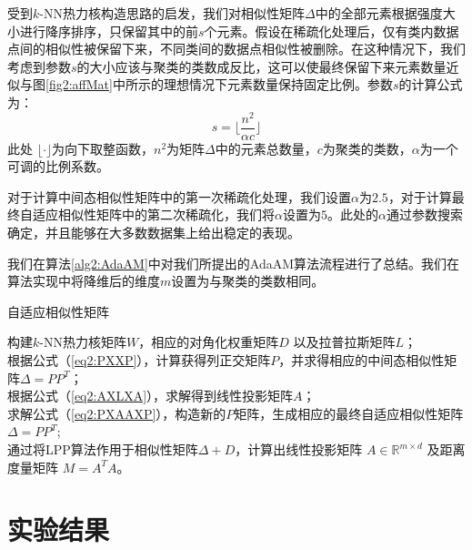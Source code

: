 受到$k$-NN热力核构造思路的启发，我们对相似性矩阵$\Delta$中的全部元素根据强度大小进行降序排序，只保留其中的前$s$个元素。假设在稀疏化处理后，仅有类内数据点间的相似性被保留下来，不同类间的数据点相似性被删除。在这种情况下，我们考虑到参数$s$的大小应该与聚类的类数成反比，这可以使最终保留下来元素数量近似与图\ref{fig2:affMat}中所示的理想情况下元素数量保持固定比例。参数$s$的计算公式为：
\begin{equation}
	s = \lfloor \frac{n^2}{\alpha c}\rfloor
\end{equation}
此处 $\lfloor \cdot\rfloor$为向下取整函数，$n^2$为矩阵$\Delta$中的元素总数量，$c$为聚类的类数，$\alpha$为一个可调的比例系数。

对于计算中间态相似性矩阵中的第一次稀疏化处理，我们设置$\alpha$为$2.5$，对于计算最终自适应相似性矩阵中的第二次稀疏化，我们将$\alpha$设置为$5$。此处的$\alpha$通过参数搜索确定，并且能够在大多数数据集上给出稳定的表现。

我们在算法\ref{alg2:AdaAM}中对我们所提出的AdaAM算法流程进行了总结。我们在算法实现中将降维后的维度$m$设置为与聚类的类数相同。


\begin{algorithm}[!htbp]
	\caption{自适应相似性矩阵}
	\label{alg2:AdaAM}
	构建$k$-NN热力核矩阵$W$，相应的对角化权重矩阵$D$ 以及拉普拉斯矩阵$L$；\\
	根据公式（\ref{eq2:PXXP}），计算获得列正交矩阵$P$，并求得相应的中间态相似性矩阵$\Delta = PP^T$；\\
	根据公式（\ref{eq2:AXLXA}），求解得到线性投影矩阵$A$；\\
	求解公式（\ref{eq2:PXAAXP}），构造新的$P$矩阵，生成相应的最终自适应相似性矩阵$\Delta = PP^T$;\\
	通过将LPP算法作用于相似性矩阵$\Delta + D$，计算出线性投影矩阵 $A\in\mathbb{R}^{m\times d}$ 及距离度量矩阵 $M=A^TA$。
\end{algorithm}

\section{实验结果}
\label{sec2:Exp}



